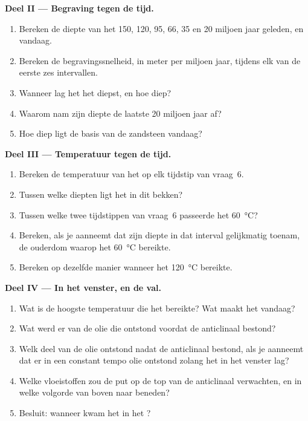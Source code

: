 \begin{problem}
\medskip
\noindent\textbf{Deel II --- Begraving tegen de tijd.}
\begin{enumerate}[resume]
  \item Bereken de diepte van het  150, 120, 95, 66, 35 en 20
        miljoen jaar geleden, en vandaag.
  \item Bereken de begravingssnelheid, in meter per miljoen jaar, tijdens
        elk van de eerste zes intervallen.
  \item Wanneer lag het  het diepst, en hoe diep?
  \item Waarom nam zijn diepte de laatste 20 miljoen jaar af?
  \item Hoe diep ligt de basis van de zandsteen vandaag?
\end{enumerate}

\medskip
\noindent\textbf{Deel III --- Temperatuur tegen de tijd.}
\begin{enumerate}[resume]
  \item Bereken de temperatuur van het  op elk tijdstip van
        vraag~6.
  \item Tussen welke diepten ligt het  in dit bekken?
  \item Tussen welke twee tijdstippen van vraag~6 passeerde het 
        \qty{60}{\degreeCelsius}?
  \item Bereken, als je aanneemt dat zijn diepte in dat interval gelijkmatig toenam, de ouderdom
        waarop het \qty{60}{\degreeCelsius} bereikte.
  \item Bereken op dezelfde manier wanneer het \qty{120}{\degreeCelsius} bereikte.
\end{enumerate}

\medskip
\noindent\textbf{Deel IV --- In het venster, en de val.}
\begin{enumerate}[resume]
  \item Wat is de hoogste temperatuur die het bereikte? Wat maakt het
        vandaag?
  \item Wat werd er van de olie die ontstond voordat de anticlinaal bestond?
  \item Welk deel van de olie ontstond nadat de anticlinaal bestond, als je aanneemt dat er in een constant
        tempo olie ontstond zolang het  in het venster lag?
  \item Welke vloeistoffen zou de put op de top van de anticlinaal verwachten,
        en in welke volgorde van boven naar beneden?
  \item Besluit: wanneer kwam het  in het ?
\end{enumerate}
\end{problem}
